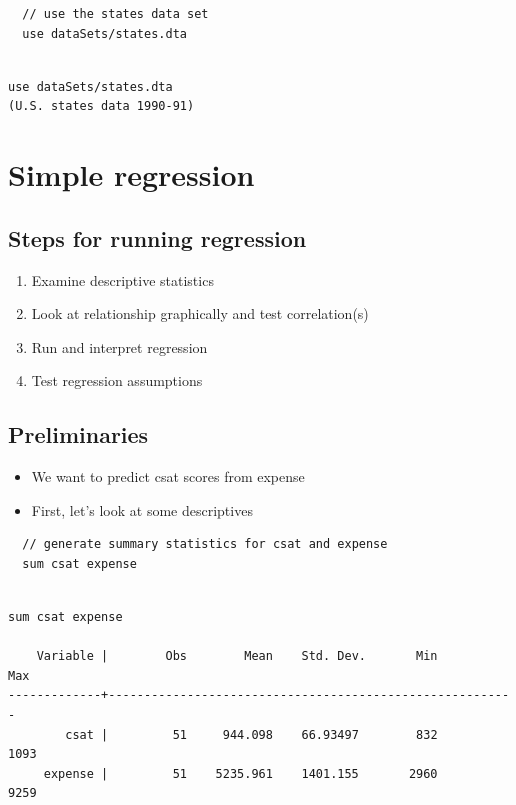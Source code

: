 \documentclass[]{book}
\providecommand{\tightlist}{%
  \setlength{\itemsep}{0pt}\setlength{\parskip}{0pt}}
\begin{document}
\begin{verbatim}
  // use the states data set
  use dataSets/states.dta
\end{verbatim}

\begin{verbatim}

use dataSets/states.dta
(U.S. states data 1990-91)
\end{verbatim}

\hypertarget{simple-regression}{%
\section{Simple regression}\label{simple-regression}}

\hypertarget{steps-for-running-regression}{%
\subsection{Steps for running regression}\label{steps-for-running-regression}}

\begin{enumerate}
\def\labelenumi{\arabic{enumi}.}
\tightlist
\item
  Examine descriptive statistics
\item
  Look at relationship graphically and test correlation(s)
\item
  Run and interpret regression
\item
  Test regression assumptions
\end{enumerate}

\hypertarget{preliminaries}{%
\subsection{Preliminaries}\label{preliminaries}}

\begin{itemize}
\tightlist
\item
  We want to predict csat scores from expense
\item
  First, let's look at some descriptives
\end{itemize}

\begin{verbatim}
  // generate summary statistics for csat and expense
  sum csat expense
\end{verbatim}

\begin{verbatim}

sum csat expense

    Variable |        Obs        Mean    Std. Dev.       Min        Max
-------------+---------------------------------------------------------
        csat |         51     944.098    66.93497        832       1093
     expense |         51    5235.961    1401.155       2960       9259
\end{verbatim}
\end{document}
